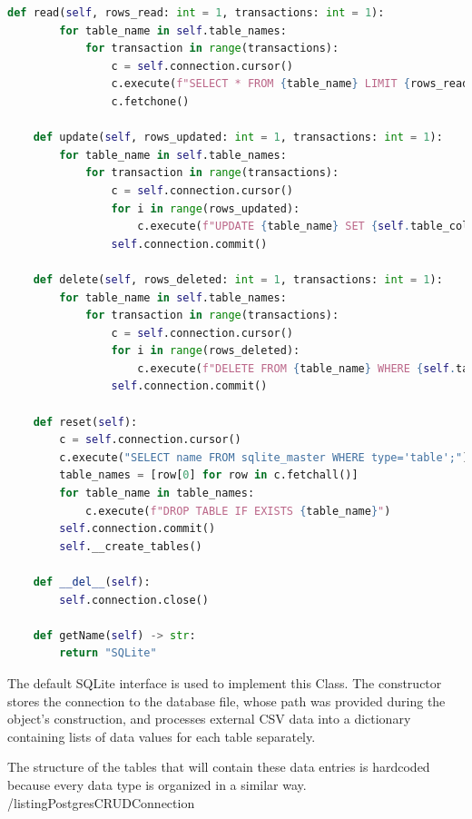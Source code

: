 \begin{lstlisting}[language=Python, caption=SQLiteDatabaseTesting]
    def read(self, rows_read: int = 1, transactions: int = 1):
        for table_name in self.table_names:
            for transaction in range(transactions):
                c = self.connection.cursor()
                c.execute(f"SELECT * FROM {table_name} LIMIT {rows_read}")
                c.fetchone()

    def update(self, rows_updated: int = 1, transactions: int = 1):
        for table_name in self.table_names:
            for transaction in range(transactions):
                c = self.connection.cursor()
                for i in range(rows_updated):
                    c.execute(f"UPDATE {table_name} SET {self.table_column_names[table_name][2]} = 0 WHERE {self.table_column_names[table_name][0]} = \"{self.csv_data[table_name][i+transaction*rows_updated][0]}\"")
                self.connection.commit()

    def delete(self, rows_deleted: int = 1, transactions: int = 1):
        for table_name in self.table_names:
            for transaction in range(transactions):
                c = self.connection.cursor()
                for i in range(rows_deleted):
                    c.execute(f"DELETE FROM {table_name} WHERE {self.table_column_names[table_name][0]} = \"{self.csv_data[table_name][i+transaction*rows_deleted][0]}\"")
                self.connection.commit()

    def reset(self):
        c = self.connection.cursor()
        c.execute("SELECT name FROM sqlite_master WHERE type='table';")
        table_names = [row[0] for row in c.fetchall()]
        for table_name in table_names:
            c.execute(f"DROP TABLE IF EXISTS {table_name}")
        self.connection.commit()
        self.__create_tables()

    def __del__(self):
        self.connection.close()

    def getName(self) -> str:
        return "SQLite"
\end{lstlisting}
\par The default SQLite interface is used to implement this Class. The constructor stores the connection to the database file, whose path was provided during the object's construction, and processes external CSV data into a dictionary containing lists of data values for each table separately. 
\par The structure of the tables that will contain these data entries is hardcoded because every data type is organized in a similar way.
/listing{PostgresCRUDConnection}

